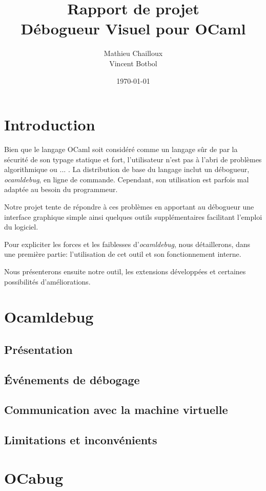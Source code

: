 \documentclass[11pt,a4paper]{report}
\title{Rapport de projet\\Débogueur Visuel pour OCaml}
\author{Mathieu Chailloux\\Vincent Botbol}
\date\today
\begin{document}
\maketitle

\chapter{Introduction}

Bien que le langage OCaml soit considéré comme un langage sûr de par la sécurité de son typage statique et fort,
l'utilisateur n'est pas à l'abri de problèmes algorithmique ou ... . La distribution de base du langage inclut %
un débogueur, \emph{ocamldebug}, en ligne de commande. Cependant, son utilisation est parfois mal adaptée au besoin du programmeur.

Notre projet tente de répondre à ces problèmes en apportant au débogueur une interface graphique simple ainsi quelques
outils supplémentaires facilitant l'emploi du logiciel.

Pour expliciter les forces et les faiblesses d'\emph{ocamldebug}, nous détaillerons, dans une première partie:
l'utilisation de cet outil et son fonctionnement interne.

Nous présenterons ensuite notre outil, les extensions développées et certaines possibilités d'améliorations.

\chapter{Ocamldebug}

\section{Présentation}
\section{\'Evénements de débogage}
\section{Communication avec la machine virtuelle}
\section{Limitations et inconvénients} %


\chapter{OCabug}
\end{document}
